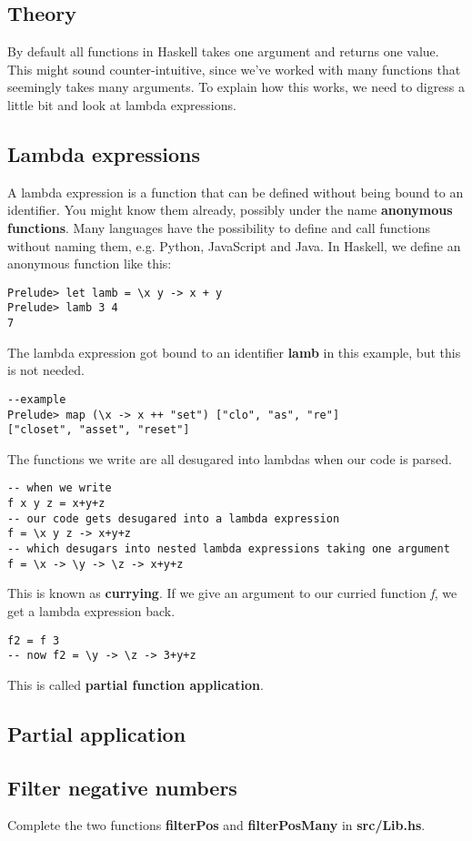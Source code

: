\documentclass{article}
\begin{document}
\subsection{Theory}
By default all functions in Haskell takes one argument and returns one value. This might sound counter-intuitive, since we've worked with many functions that seemingly takes many arguments. To explain how this works, we need to digress a little bit and look at lambda expressions.
\subsection{Lambda expressions}
A lambda expression is a function that can be defined without being bound to an identifier. You might know them already, possibly under the name \textbf{anonymous functions}. Many languages have the possibility to define and call functions without naming them, e.g. Python, JavaScript and Java. In Haskell, we define an anonymous function like this:
\lstset{language=Haskell}
\begin{lstlisting}
Prelude> let lamb = \x y -> x + y
Prelude> lamb 3 4
7
\end{lstlisting}
The lambda expression got bound to an identifier \textbf{lamb} in this example, but this is not needed.
\lstset{language=Haskell}
\begin{lstlisting}
--example
Prelude> map (\x -> x ++ "set") ["clo", "as", "re"]
["closet", "asset", "reset"]
\end{lstlisting}
The functions we write are all desugared into lambdas when our code is parsed.
\begin{lstlisting}
-- when we write
f x y z = x+y+z
-- our code gets desugared into a lambda expression
f = \x y z -> x+y+z
-- which desugars into nested lambda expressions taking one argument
f = \x -> \y -> \z -> x+y+z
\end{lstlisting}
This is known as \textbf{currying}. If we give an argument to our curried function \textit{f}, we get a lambda expression back.
\begin{lstlisting}
f2 = f 3
-- now f2 = \y -> \z -> 3+y+z
\end{lstlisting}
This is called \textbf{partial function application}.
\subsection{Partial application}
\subsection{Filter negative numbers}
Complete the two functions \textbf{filterPos} and \textbf{filterPosMany} in \textbf{src/Lib.hs}.
\end{document}

